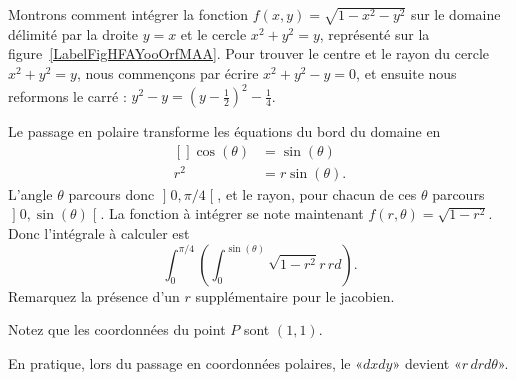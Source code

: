 \begin{example}     \label{ExpmfDtAtV}
	Montrons comment intégrer la fonction $f(x,y)=\sqrt{1-x^2-y^2}$ sur le domaine délimité par la droite $y=x$ et le cercle $x^2+y^2=y$, représenté sur la figure~\ref{LabelFigHFAYooOrfMAA}. Pour trouver le centre et le rayon du cercle $x^2+y^2=y$, nous commençons par écrire $x^2+y^2-y=0$, et ensuite nous reformons le carré : $y^2-y=(y-\frac{ 1 }{2})^2-\frac{1}{ 4 }$.

	\newcommand{\CaptionFigHFAYooOrfMAA}{Passage en polaire pour intégrer sur un morceau de cercle.}
	

	Le passage en polaire transforme les équations du bord du domaine en
	\begin{equation}
		\begin{aligned}[]
			\cos(\theta) & =\sin(\theta)   \\
			r^2          & =r\sin(\theta).
		\end{aligned}
	\end{equation}
	L'angle $\theta$ parcours donc $\mathopen] 0 , \pi/4 \mathclose[$, et le rayon, pour chacun de ces $\theta$ parcours $\mathopen] 0 , \sin(\theta) \mathclose[$. La fonction à intégrer se note maintenant $f(r,\theta)=\sqrt{1-r^2}$. Donc l'intégrale à calculer est
	\begin{equation}		\label{PgOMRapIntMultFubiniBoutCercle}
		\int_{0}^{\pi/4}\left( \int_0^{\sin(\theta)}\sqrt{1-r^2}r\,rd \right).
	\end{equation}
	Remarquez la présence d'un $r$ supplémentaire pour le jacobien.

	Notez que les coordonnées du point $P$ sont $(1,1)$.
\end{example}

En pratique, lors du passage en coordonnées polaires, le «$dxdy$» devient «$r\,drd\theta$».

